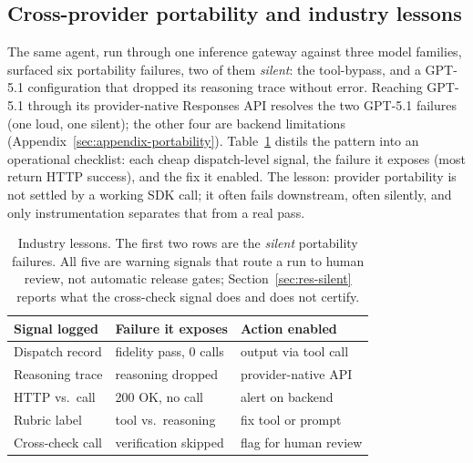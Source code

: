 \documentclass[11pt]{article}
\begin{document}
\subsection{Cross-provider portability and industry lessons}
\label{sec:res-portability}
The same agent, run through one inference gateway against three model
families, surfaced six portability failures, two of them \emph{silent}:
the tool-bypass, and a GPT-5.1 configuration that dropped its reasoning
trace without error.
Reaching GPT-5.1 through its provider-native Responses API resolves the
two GPT-5.1 failures (one loud, one silent); the other four are backend
limitations (Appendix~\ref{sec:appendix-portability}).
Table~\ref{tab:lessons} distils the pattern into an operational
checklist: each cheap dispatch-level signal, the failure it exposes
(most return HTTP success), and the fix it enabled. The lesson:
provider portability is not settled by a working SDK call; it often
fails downstream, often silently, and only instrumentation separates
that from a real pass.

\begin{table}[t]
\centering
\footnotesize
\setlength{\tabcolsep}{2pt}
\begin{tabular}{@{}lll@{}}
\toprule
\textbf{Signal logged} & \textbf{Failure it exposes} & \textbf{Action enabled} \\
\midrule
Dispatch record   & fidelity pass, 0 calls & output via tool call \\
Reasoning trace   & reasoning dropped           & provider-native API \\
HTTP vs.\ call    & 200 OK, no call             & alert on backend \\
Rubric label      & tool vs.\ reasoning         & fix tool or prompt \\
Cross-check call  & verification skipped        & flag for human review \\
\bottomrule
\end{tabular}
\caption{Industry lessons. The first two rows are the \emph{silent}
portability failures. All five are warning signals that route a run to
human review, not automatic release gates; Section~\ref{sec:res-silent}
reports what the cross-check signal does and does not certify.}
\label{tab:lessons}
\end{table}
\end{document}
